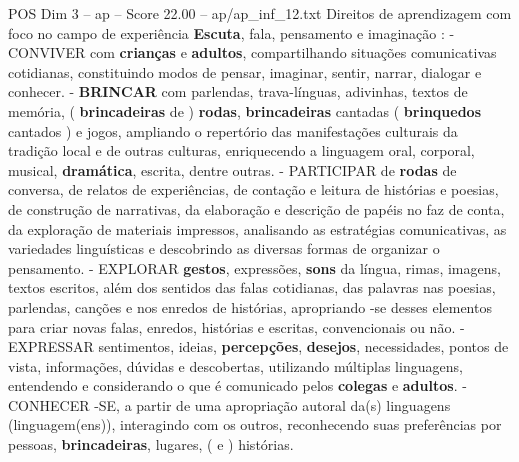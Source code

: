 \begin{textsample}{POS Dim 3 – ap – Score 22.00 – ap/ap\_inf\_12.txt}
Direitos de aprendizagem com foco no campo de experiência \textbf{Escuta}, fala, pensamento e imaginação : - CONVIVER com \textbf{crianças} e \textbf{adultos}, compartilhando situações comunicativas cotidianas, constituindo modos de pensar, imaginar, sentir, narrar, dialogar e conhecer. - \textbf{BRINCAR} com parlendas, trava-línguas, adivinhas, textos de memória, ( \textbf{brincadeiras} de ) \textbf{rodas}, \textbf{brincadeiras} cantadas ( \textbf{brinquedos} cantados ) e jogos, ampliando o repertório das manifestações culturais da tradição local e de outras culturas, enriquecendo a linguagem oral, corporal, musical, \textbf{dramática}, escrita, dentre outras. - PARTICIPAR de \textbf{rodas} de conversa, de relatos de experiências, de contação e leitura de histórias e poesias, de construção de narrativas, da elaboração e descrição de papéis no faz de conta, da exploração de materiais impressos, analisando as estratégias comunicativas, as variedades linguísticas e descobrindo as diversas formas de organizar o pensamento. - EXPLORAR \textbf{gestos}, expressões, \textbf{sons} da língua, rimas, imagens, textos escritos, além dos sentidos das falas cotidianas, das palavras nas poesias, parlendas, canções e nos enredos de histórias, apropriando -se desses elementos para criar novas falas, enredos, histórias e escritas, convencionais ou não. - EXPRESSAR sentimentos, ideias, \textbf{percepções}, \textbf{desejos}, necessidades, pontos de vista, informações, dúvidas e descobertas, utilizando múltiplas linguagens, entendendo e considerando o que é comunicado pelos \textbf{colegas} e \textbf{adultos}. - CONHECER -SE, a partir de uma apropriação autoral da(s) linguagens (linguagem(ens)), interagindo com os outros, reconhecendo suas preferências por pessoas, \textbf{brincadeiras}, lugares, ( e ) histórias.

\end{textsample}
